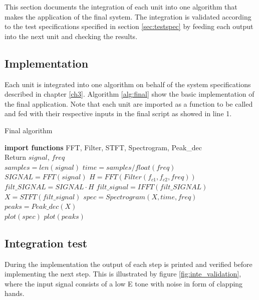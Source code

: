 This section documents the integration of each unit into one algorithm that makes the application of the final system. The integration is validated according to the test specifications specified in section \ref{sec:testspec} by feeding each output into the next unit and checking the results. 

\subsection{Implementation}
Each unit is integrated into one algorithm on behalf of the system specifications described in chapter \ref{ch3}. Algorithm \ref{alg:final} show the basic implementation of the final application. Note that each unit are imported as a function to be called and fed with their respective inputs in the final script as showed in line 1.
\begin{algorithm}[H]
\caption{Final algorithm}
\begin{algorithmic}[1]
\State \textbf{import functions} FFT, Filter, STFT, Spectrogram, Peak\_dec  
\\
\State Return $signal$, $freq$ 
\EndProcedure 
\\
\State $samples = len(signal)$ 
\State $time   = samples/float(freq)$
\\
\State $SIGNAL = FFT(signal) $
\State $H = FFT(Filter(f_{c1},f_{c2},freq))$
\State $filt\_SIGNAL = SIGNAL \cdot H$
\State $filt\_signal = IFFT(filt\_SIGNAL)$  
\EndProcedure 
\\
\State $X = STFT(filt\_signal)$
\State $spec = Spectrogram(X,time,freq)$
\State $peaks = Peak\_dec(X)$
\EndProcedure
\\
\State $plot(spec)$ 
\State $plot(peaks)$
\EndProcedure
\end{algorithmic}
\label{alg:final}
\end{algorithm}          

\subsection{Integration test}
During the implementation the output of each step is printed and verified before implementing the next step. This is illustrated by figure \ref{fig:inte_validation}, where the input signal consists of a low E tone with noise in form of clapping hands.  

